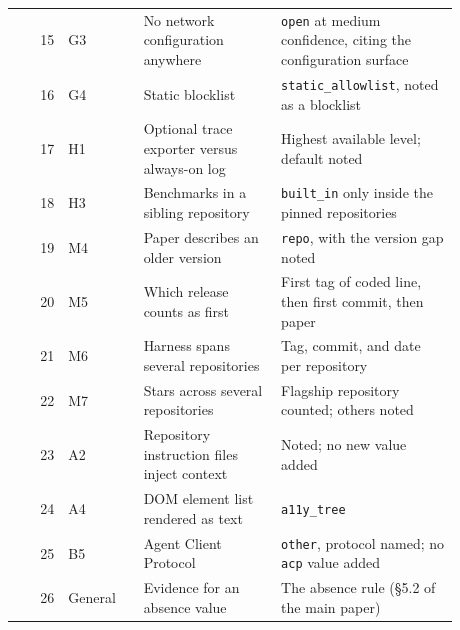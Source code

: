 \begin{table}[htbp]
\begin{tabular}{@{}r p{0.17\linewidth} p{0.31\linewidth} p{0.40\linewidth}@{}}
15 & G3 & \raggedright No network configuration anywhere & \raggedright \texttt{open} at medium confidence, citing the configuration surface \tabularnewline
16 & G4 & \raggedright Static blocklist & \raggedright \texttt{static\_allowlist}, noted as a blocklist \tabularnewline
17 & H1 & \raggedright Optional trace exporter versus always-on log & \raggedright Highest available level; default noted \tabularnewline
18 & H3 & \raggedright Benchmarks in a sibling repository & \raggedright \texttt{built\_in} only inside the pinned repositories \tabularnewline
19 & M4 & \raggedright Paper describes an older version & \raggedright \texttt{repo}, with the version gap noted \tabularnewline
20 & M5 & \raggedright Which release counts as first & \raggedright First tag of coded line, then first commit, then paper \tabularnewline
21 & M6 & \raggedright Harness spans several repositories & \raggedright Tag, commit, and date per repository \tabularnewline
22 & M7 & \raggedright Stars across several repositories & \raggedright Flagship repository counted; others noted \tabularnewline
23 & A2 & \raggedright Repository instruction files inject context & \raggedright Noted; no new value added \tabularnewline
24 & A4 & \raggedright DOM element list rendered as text & \raggedright \texttt{a11y\_tree} \tabularnewline
25 & B5 & \raggedright Agent Client Protocol & \raggedright \texttt{other}, protocol named; no \texttt{acp} value added \tabularnewline
26 & General & \raggedright Evidence for an absence value & \raggedright The absence rule (\S5.2 of the main paper) \tabularnewline
\bottomrule
\end{tabular}
\end{table}
